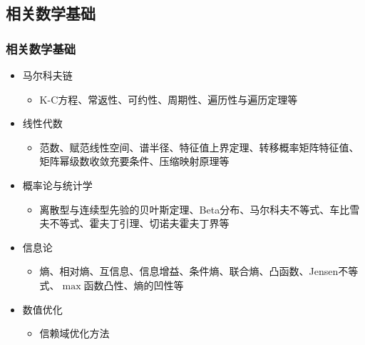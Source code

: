 \documentclass{beamer}
\begin{document}
\begin{CJK*}{GBK}{hei}
\section{相关数学基础}
\begin{frame}\frametitle{相关数学基础}
\begin{itemize}
\item 马尔科夫链\citep{sp2008heshuyuan}\citep{kangconglu2015}
{
    \begin{itemize}
        \item K-C方程、常返性、可约性、周期性、遍历性与遍历定理等
    \end{itemize}
}
\item 线性代数\citep{matrix2013fang}
{
    \begin{itemize}
        \item 范数、赋范线性空间、谱半径、特征值上界定理、转移概率矩阵特征值、矩阵幂级数收敛充要条件、压缩映射原理等
    \end{itemize}
}
\item 概率论与统计学\citep{casella2007statistical}\citep{thinkbayes2013}\citep{bayesianupdate}\citep{Hoeffdingnotes}
{
    \begin{itemize}
        \item 离散型与连续型先验的贝叶斯定理、Beta分布、马尔科夫不等式、车比雪夫不等式、霍夫丁引理、切诺夫霍夫丁界等
    \end{itemize}
}
\item 信息论\citep{2006Elements}
{
    \begin{itemize}
        \item 熵、相对熵、互信息、信息增益、条件熵、联合熵、凸函数、Jensen不等式、$\max$函数凸性、熵的凹性等
    \end{itemize}
}
\item 数值优化\citep{Gaoli2014numoptimize}
{
    \begin{itemize}
        \item 信赖域优化方法
    \end{itemize}
}
\end{itemize}
\end{frame}


\end{CJK*}
\end{document}
